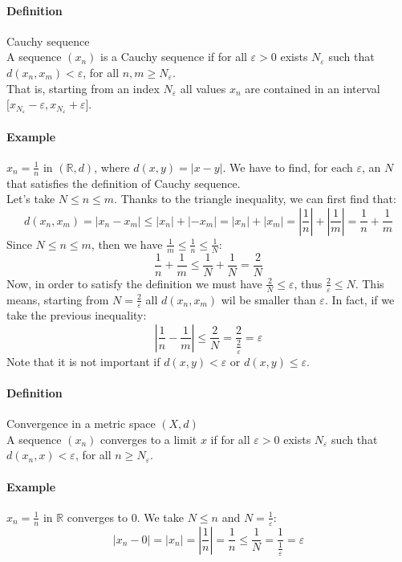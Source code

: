 \documentclass{article}
\newcommand{\abs}[1]{\left|#1\right|}
\newcommand{\R}{\mathbb{R}}
\newcommand{\Ep}{\varepsilon}
\newcommand{\Def}{\paragraph{Definition}}
\newcommand{\Example}{\paragraph{Example}}
\begin{document}
  \Def Cauchy sequence
\\A sequence $(x_n)$ is a Cauchy sequence if for all $\Ep > 0$ exists
  $N_\Ep$ such that $d(x_n,x_m) < \Ep$, for all $n, m \geq N_\Ep$.
\\That is, starting from an index $N_\Ep$ all values $x_n$ are contained in
  an interval ${[}x_{N_\Ep} - \Ep, x_{N_\Ep} + \Ep{]}$.

  \Example $x_n = \frac{1}{n}$ in $(\R, d)$, where $d(x,y) = \abs{x - y}$. We
  have to find, for each $\Ep$, an $N$ that satisfies the definition of
  Cauchy sequence.
\\Let's take $N \leq n \leq m$. Thanks to the triangle inequality, we can first
  find that:
  \begin{equation*}
    d(x_n,x_m) = \abs{x_n - x_m} \leq \abs{x_n} + \abs{-x_m} =
    \abs{x_n} + \abs{x_m} = \abs{\frac{1}{n}} + \abs{\frac{1}{m}} =
    \frac{1}{n} + \frac{1}{m}
  \end{equation*}
  Since $N \leq n \leq m$, then we have $\frac{1}{m} \leq \frac{1}{n} \leq
  \frac{1}{N}$:
  \begin{equation*}
    \frac{1}{n} + \frac{1}{m} \leq
    \frac{1}{N} + \frac{1}{N} = \frac{2}{N}
  \end{equation*}
  Now, in order to satisfy the definition we must have $\frac{2}{N} \leq
  \Ep$, thus $\frac{2}{\Ep} \leq N$. This means, starting from $N =
\frac{2}{\Ep}$ all $d(x_n,x_m)$ wil be smaller than $\Ep$. In fact,
  if we take the previous inequality:
  \begin{equation*}
    \abs{\frac{1}{n} - \frac{1}{m}} \leq
    \frac{2}{N} = \frac{2}{\frac{2}{\Ep}} = \Ep
  \end{equation*}
  Note that it is not important if $d(x,y) < \Ep$ or $d(x,y) \leq \Ep$.

  \Def Convergence in a metric space $(X, d)$
\\A sequence $(x_n)$ converges to a limit $x$ if for all $\Ep > 0$ exists
  $N_\Ep$ such that $d(x_n,x) < \Ep$, for all $n \geq N_\Ep$.

  \Example $x_n = \frac{1}{n}$ in $\R$ converges to 0. We take $N \leq n$ and
  $N = \frac{1}{\Ep}$:
  \begin{equation*}
    \abs{x_n - 0} = \abs{x_n} = \abs{\frac{1}{n}} = \frac{1}{n} \leq \frac{1}{N}
    = \frac{1}{\frac{1}{\Ep}} = \Ep
  \end{equation*}
\end{document}
